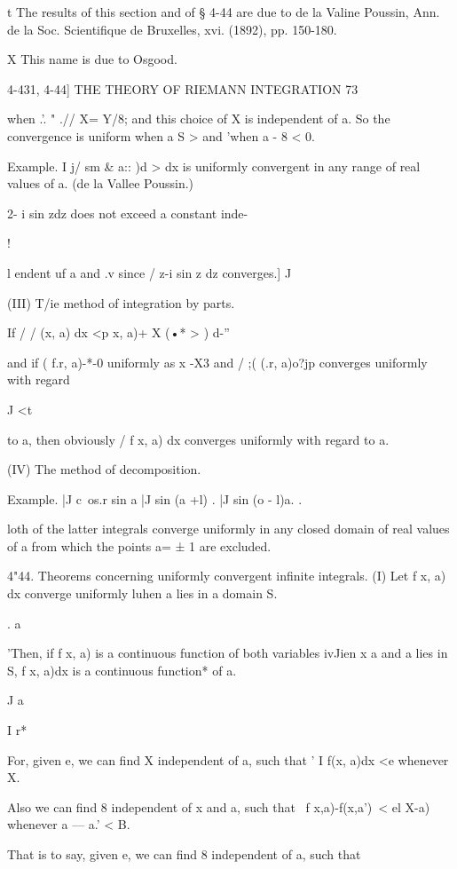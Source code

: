 t The results of this section and of § 4-44 are due to de la Valine Poussin, Ann. de la Soc. 
Scientifique de Bruxelles, xvi. (1892), pp. 150-180. 

X This name is due to Osgood. 



4-431, 4-44] THE THEORY OF RIEMANN INTEGRATION 73 

when .'. " .// X= Y/8; and this choice of X is independent of a. So the convergence is 
uniform when a   S > and 'when a   - 8 < 0. 

Example. I j/ sm \& a:: )d > dx is uniformly convergent in any range of real 
values of a. (de la Vallee Poussin.) 

2- i sin zdz does not exceed a constant inde- 

! 

l endent uf a and .v since / z-i sin z dz converges.] 
J 

(III) T/ie method of integration by parts. 

If / / (x, a) dx  <p x, a)+ X (•* >  ) d-'' 

and if ( f.r, a)-*-0 uniformly as x -X3 and / ;( (.r, a)o?jp converges uniformly with regard 

J <t 

to a, then obviously / f x, a) dx converges uniformly with regard to a. 

(IV) The method of decomposition. 

Example. |J c\ os.r sin a   |J sin (a +l)  . |J sin (o - l)a.   . 

loth of the latter integrals converge uniformly in any closed domain of real values of 
a from which the points a= ± 1 are excluded. 

4"44. Theorems concerning uniformly convergent infinite integrals. 
(I) Let f x, a) dx converge uniformly luhen a lies in a domain S. 

. a 

'Then, if f x, a) is a continuous function of both variables ivJien x  a and 
a lies in S, f x, a)dx is a continuous function* of a. 

J a 

I r* 

For, given e, we can find X independent of a, such that ' I f(x, a)dx <e 
whenever  X. 

Also we can find 8 independent of x and a, such that 
\ f x,a)-f(x,a')\ < el X-a) 
whenever a — a.' < B. 

That is to say, given e, we can find 8 independent of a, such that 

